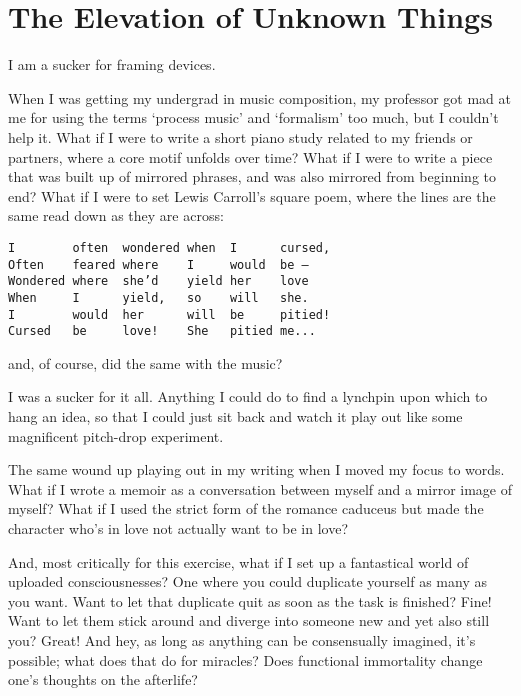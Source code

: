 \hypertarget{the-elevation-of-unknown-things}{%
\section*{The Elevation of Unknown Things}\label{the-elevation-of-unknown-things}}

I am a sucker for framing devices.

When I was getting my undergrad in music composition, my professor got mad at me for using the terms `process music' and `formalism' too much, but I couldn't help it. What if I were to write a short piano study related to my friends or partners, where a core motif unfolds over time? What if I were to write a piece that was built up of mirrored phrases, and was also mirrored from beginning to end? What if I were to set Lewis Carroll's square poem, where the lines are the same read down as they are across:

\begin{verbatim}
I        often  wondered when  I      cursed,
Often    feared where    I     would  be —
Wondered where  she’d    yield her    love
When     I      yield,   so    will   she.
I        would  her      will  be     pitied!
Cursed   be     love!    She   pitied me...
\end{verbatim}

and, of course, did the same with the music?

I was a sucker for it all. Anything I could do to find a lynchpin upon which to hang an idea, so that I could just sit back and watch it play out like some magnificent pitch-drop experiment.

The same wound up playing out in my writing when I moved my focus to words. What if I wrote a memoir as a conversation between myself and a mirror image of myself? What if I used the strict form of the romance caduceus but made the character who's in love not actually want to be in love?

And, most critically for this exercise, what if I set up a fantastical world of uploaded consciousnesses? One where you could duplicate yourself as many as you want. Want to let that duplicate quit as soon as the task is finished? Fine! Want to let them stick around and diverge into someone new and yet also still you? Great! And hey, as long as anything can be consensually imagined, it's possible; what does that do for miracles? Does functional immortality change one's thoughts on the afterlife?

